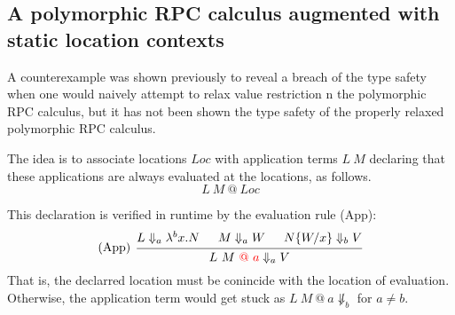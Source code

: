 \documentclass[a4paper]{article}
\makeatletter
\theoremstyle{plain}
\theoremstyle{definition}
\newcommand{\evalRPC}[3]{#1\Downarrow_{#2}#3}
\newcommand{\lamL}[3]{\lambda^{#1}#2.#3}
\newcommand{\subst}[2]{\{#1/#2\}}
\newcommand{\Loc}{Loc}
\newcommand{\at}[1]{@#1}
\makeatother
\begin{document}

\subsection{A polymorphic RPC calculus augmented with static location contexts}

%
A counterexample was shown previously to reveal a breach of the type
safety when one would naively attempt to relax value restriction n the
polymorphic RPC calculus, but it has not been shown the type safety of
the properly relaxed polymorphic RPC calculus.
%

The idea is to associate locations $\Loc$ with application terms $L
\ M$ declaring that these applications are always evaluated at the
locations, as follows.
\[
L \ M \ @ \ \Loc
\]

%
This declaration is verified in runtime by the evaluation rule (App):
\[
    \begin{prooftree}
      \hypo{ \evalRPC{L}{a}{\lamL{b}{x}{N}} }
      \hypo{ \evalRPC{M}{a}{W} }
      \hypo{ \evalRPC{N\subst{W}{x}}{b}{V}  }
      \infer[left label=(App)]3{ \evalRPC{L \ M \ {\color{red} \at{\ a}}}{a}{V}  }
    \end{prooftree}
\]
%
That is, the declarred location must be conincide with the location of
evaluation.
%
Otherwise, the application term would get stuck as $L \ M
\ \at{\ a}\not\Downarrow_{b}$ for $a\not=b$.
\end{document}
